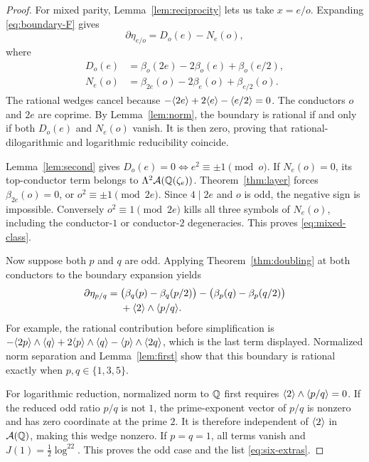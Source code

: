 \begin{proof}
For mixed parity, Lemma~\ref{lem:reciprocity} lets us take $x=e/o$.
Expanding \eqref{eq:boundary-F} gives
\begin{equation}\label{eq:mixed-boundary}
 \partial\eta_{e/o}=D_o(e)-N_e(o),
\end{equation}
where
\begin{align}
 D_o(e)&=\beta_o(2e)-2\beta_o(e)+\beta_o(e/2),\label{eq:D}\\
 N_e(o)&=\beta_{2e}(o)-2\beta_e(o)+\beta_{e/2}(o).\label{eq:N}
\end{align}
The rational wedges cancel because
$-\langle 2e\rangle+2\langle e\rangle-\langle e/2\rangle=0$. The conductors $o$ and $2e$ are
coprime. By Lemma~\ref{lem:norm}, the boundary is rational if and only
if both $D_o(e)$ and $N_e(o)$ vanish. It is then zero, proving that
rational-dilogarithmic and logarithmic reducibility coincide.

Lemma~\ref{lem:second} gives
$D_o(e)=0\Longleftrightarrow e^2\equiv\pm1\pmod o$.
If $N_e(o)=0$, its top-conductor term belongs to
$\Lambda^2\mathcal A(\mathbb Q(\zeta_e))$. Theorem~\ref{thm:layer} forces
$\beta_{2e}(o)=0$, or $o^2\equiv\pm1\pmod{2e}$.
Since $4\mid2e$ and $o$ is odd, the negative sign is impossible.
Conversely $o^2\equiv1\pmod{2e}$ kills all three symbols of
$N_e(o)$, including the conductor-$1$ or conductor-$2$ degeneracies.
This proves \eqref{eq:mixed-class}.

Now suppose both $p$ and $q$ are odd. Applying
Theorem~\ref{thm:doubling} at both conductors to the boundary expansion
yields
\begin{equation}\label{eq:odd-boundary}
 \begin{split}
 \partial\eta_{p/q}={}&
  \bigl(\beta_q(p)-\beta_q(p/2)\bigr)
 -\bigl(\beta_p(q)-\beta_p(q/2)\bigr)\\
 &+\langle 2\rangle\wedge\langle p/q\rangle.
 \end{split}
\end{equation}
For example, the rational contribution before simplification is
$-\langle 2p\rangle\wedge\langle q\rangle+2\langle p\rangle\wedge\langle q\rangle
 -\langle p\rangle\wedge\langle 2q\rangle$, which is the last term displayed.
Normalized norm separation and Lemma~\ref{lem:first} show that this
boundary is rational exactly when $p,q\in\{1,3,5\}$.

For logarithmic reduction, normalized norm to $\mathbb Q$ first requires
$\langle 2\rangle\wedge\langle p/q\rangle=0$. If the reduced odd ratio $p/q$ is not $1$,
the prime-exponent vector of $p/q$ is nonzero and has zero coordinate
at the prime $2$. It is therefore independent of $\langle 2\rangle$ in
$\mathcal A(\mathbb Q)$, making this wedge nonzero. If $p=q=1$, all terms vanish
and $J(1)=\tfrac12\log^22$. This proves the odd case and the list
\eqref{eq:six-extras}.
\end{proof}

